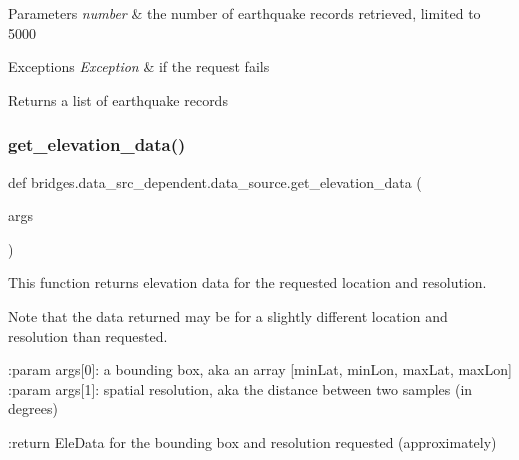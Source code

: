 \begin{DoxyParams}{Parameters}
{\em number} & the number of earthquake records retrieved, limited to 5000 \\
\hline
\end{DoxyParams}

\begin{DoxyExceptions}{Exceptions}
{\em Exception} & if the request fails\\
\hline
\end{DoxyExceptions}
\begin{DoxyReturn}{Returns}
a list of earthquake records 
\end{DoxyReturn}
\mbox{\label{namespacebridges_1_1data__src__dependent_1_1data__source_a5193a0d8e1507b1cedb5de65f1d702bd}} 
\subsubsection{\texorpdfstring{get\+\_\+elevation\+\_\+data()}{get\_elevation\_data()}}
{\footnotesize\ttfamily def bridges.\+data\+\_\+src\+\_\+dependent.\+data\+\_\+source.\+get\+\_\+elevation\+\_\+data (\begin{DoxyParamCaption}\item[{}]{args }\end{DoxyParamCaption})}



This function returns elevation data for the requested location and resolution. 

Note that the data returned may be for a slightly different location and resolution than requested.

\+:param args\mbox{[}0\mbox{]}\+: a bounding box, aka an array \mbox{[}min\+Lat, min\+Lon, max\+Lat, max\+Lon\mbox{]} \+:param args\mbox{[}1\mbox{]}\+: spatial resolution, aka the distance between two samples (in degrees)

\+:return Ele\+Data for the bounding box and resolution requested (approximately) \mbox{\label{namespacebridges_1_1data__src__dependent_1_1data__source_a31b64b8c7a42cdfca0a5f0ae3da187d2}} 
